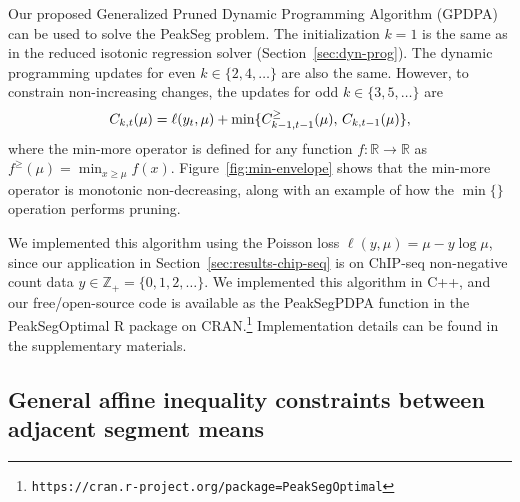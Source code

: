 \documentclass[aoas]{imsart}
\newcommand{\url}[1]{\texttt{#1}}
\newcommand{\ZZ}{\mathbb Z}
\newcommand{\RR}{\mathbb R}
\begin{document}
Our proposed Generalized Pruned Dynamic Programming Algorithm (GPDPA)
can be used to solve the PeakSeg problem. The initialization $k=1$ is
the same as in the reduced isotonic regression solver
(Section~\ref{sec:dyn-prog}). The dynamic programming updates for even
$k\in\{2, 4, \dots\}$ are also the same. However, to constrain non-increasing
changes, the updates for odd $k\in\{3, 5, \dots\}$ are
\begin{equation}
  \FCC_{k,t}(\mu) = \ell(y_t, \mu) + \min\{
  \FCC_{k-1,t-1}^\geq(\mu),\, \FCC_{k,t-1}(\mu)
  \},
\end{equation}
where the min-more operator is defined for any function $f:\RR\rightarrow\RR$ as
$f^\geq(\mu) = \min_{x\geq \mu} f(x)$. Figure~\ref{fig:min-envelope}
shows that the min-more operator is monotonic non-decreasing, along
with an example of how the $\min\{\}$ operation performs pruning.

We implemented this algorithm using the Poisson loss
$\ell(y, \mu) = \mu - y\log \mu$, since our application in
Section~\ref{sec:results-chip-seq} is on ChIP-seq non-negative count data
$y\in\ZZ_+ = \{0, 1, 2, \dots\}$.
We implemented this algorithm in C++, and our free/open-source code is
available as the PeakSegPDPA function in the PeakSegOptimal R package
on
CRAN.\footnote{\url{https://cran.r-project.org/package=PeakSegOptimal}}
Implementation details can be found in the supplementary materials.

\subsection{General affine inequality constraints
  between adjacent segment means}
\label{sec:general}

\end{document}
